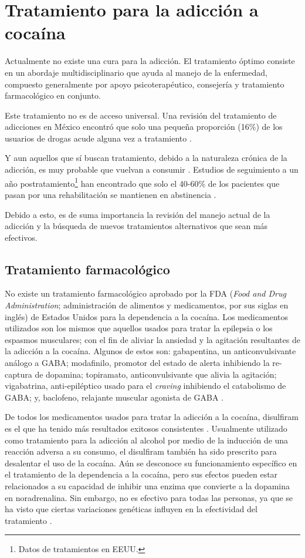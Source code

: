 \section{Tratamiento para la adicción a cocaína}
Actualmente no existe una cura para la adicción.
El tratamiento óptimo consiste en un abordaje multidisciplinario que ayuda al manejo de la enfermedad, compuesto generalmente por apoyo psicoterapéutico, consejería y tratamiento farmacológico en conjunto. \par
Este tratamiento no es de acceso universal. Una revisión del tratamiento de adicciones en México encontró que solo una pequeña proporción (16\%) de los usuarios de drogas acude alguna vez a tratamiento \parencite{Rojas2011}.\par
Y aun aquellos que sí buscan tratamiento, debido a la naturaleza crónica de la adicción, es muy probable que vuelvan a consumir \parencite{NIDA.}.
Estudios de seguimiento a un año postratamiento\footnote{Datos de tratamientos en EEUU.} han encontrado que solo el 40-60\% de los pacientes que pasan por una rehabilitación se mantienen en abstinencia \parencite{McLellan2000a}.\par
Debido a esto, es de suma importancia la revisión del manejo actual de la adicción y la búsqueda de nuevos tratamientos alternativos que sean más efectivos.

\subsection{Tratamiento farmacológico}
No existe un tratamiento farmacológico aprobado por la FDA (\textit{Food and Drug Administration}; administración de alimentos y medicamentos, por sus siglas en inglés) de Estados Unidos para la dependencia a la cocaína.
Los medicamentos utilizados son los mismos que aquellos usados para tratar la epilepsia o los espasmos musculares; con el fin de aliviar la ansiedad y la agitación resultantes de la adicción a la cocaína.
Algunos de estos son: gabapentina, un anticonvulsivante análogo a GABA; modafinilo, promotor del estado de alerta inhibiendo la re-captura de dopamina; topiramato, anticonvulsivante que alivia la agitación; vigabatrina, anti-epiléptico usado para el \textit{craving} inhibiendo el catabolismo de GABA; y, baclofeno, relajante muscular agonista de GABA \parencite{Volkow2007b}.\par
De todos los medicamentos usados para tratar la adicción a la cocaína, disulfiram es el que ha tenido más resultados exitosos consistentes \parencite{Volkow2007b}.
Usualmente utilizado como tratamiento para la adicción al alcohol por medio de la inducción de una reacción adversa a su consumo, el disulfiram también ha sido prescrito para desalentar el uso de la cocaína.
Aún se desconoce su funcionamiento específico en el tratamiento de la dependencia a la cocaína, pero sus efectos pueden estar relacionados a su capacidad de inhibir una enzima que convierte a la dopamina en noradrenalina.
Sin embargo, no es efectivo para todas las personas, ya que se ha visto que ciertas variaciones genéticas influyen en la efectividad del tratamiento \parencite{Gaval-Cruz2009a, Volkow2007b}.

